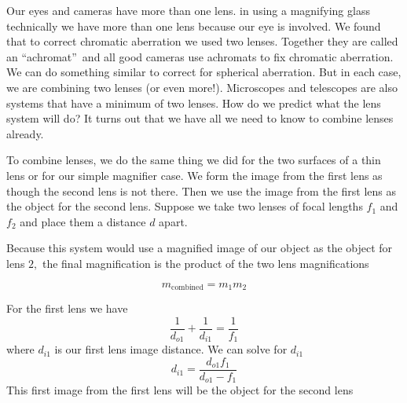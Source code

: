 \documentclass{article}
\begin{document}
Our eyes and cameras have more than one lens. in using a magnifying glass
technically we have more than one lens because our eye is involved. We found
that to correct chromatic aberration we used two lenses. Together they are
called an \textquotedblleft achromat\textquotedblright\ and all good cameras
use achromats to fix chromatic aberration. We can do something similar to
correct for spherical aberration. But in each case, we are combining two
lenses (or even more!). Microscopes and telescopes are also systems that
have a minimum of two lenses. How do we predict what the lens system will
do? It turns out that we have all we need to know to combine lenses already.

To combine lenses, we do the same thing we did for the two surfaces of a
thin lens or for our simple magnifier case. We form the image from the first
lens as though the second lens is not there. Then we use the image from the
first lens as the object for the second lens. Suppose we take two lenses of
focal lengths $f_{1}$ and $f_{2}$ and place them a distance $d$ apart. 

Because this system would use a magnified image of our object as the object
for lens $2,$ the final magnification is the product of the two lens
magnifications

\begin{equation}
m_{\text{combined}}=m_{1}m_{2}
\end{equation}

For the first lens we have%
\begin{equation}
\frac{1}{d_{o1}}+\frac{1}{d_{i1}}=\frac{1}{f_{1}}
\end{equation}%
where $d_{i1}$ is our first lens image distance. We can solve for $d_{i1}$%
\begin{equation}
d_{i1}=\frac{d_{o1}f_{1}}{d_{o1}-f_{1}}  \label{q}
\end{equation}%
This first image from the first lens will be the object for the second lens
\end{document}
